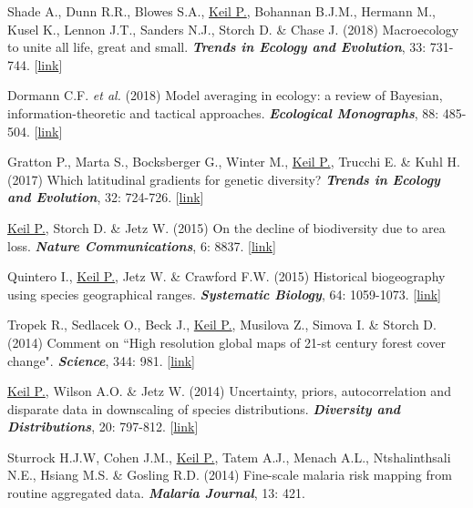 \begin{etaremune}
\item Shade A., Dunn R.R., Blowes S.A., \underline{Keil P.}, Bohannan B.J.M., Hermann M., Kusel K., Lennon J.T., Sanders N.J., Storch D. \& Chase J. (2018) Macroecology to unite all life, great and small. \textit{\textbf{Trends in Ecology and Evolution}}, 33: 731-744. [\href{https://www.sciencedirect.com/science/article/pii/S0169534718301861?via%3Dihub}{link}]

\item Dormann C.F. \textit{et al.} (2018) Model averaging in ecology: a review of Bayesian, information-theoretic and tactical approaches. \textit{\textbf{Ecological Monographs}}, 88: 485-504. [\href{https://esajournals.onlinelibrary.wiley.com/doi/10.1002/ecm.1309}{link}]

\item Gratton P., Marta S., Bocksberger G., Winter M., \underline{Keil P.}, Trucchi E. \& Kuhl H. (2017) Which latitudinal gradients for genetic diversity? \textit{\textbf{Trends in Ecology and Evolution}}, 32: 724-726. [\href{https://www.sciencedirect.com/science/article/pii/S0169534717301830?via%3Dihub}{link}]

\item \underline{Keil P.}, Storch D. \& Jetz W. (2015) On the decline of biodiversity due to area loss. \textit{\textbf{Nature Communications}}, 6: 8837. [\href{https://www.nature.com/articles/ncomms9837}{link}]

\item Quintero I., \underline{Keil P.}, Jetz W. \& Crawford F.W. (2015) Historical biogeography using species geographical ranges. \textit{\textbf{Systematic Biology}}, 64: 1059-1073. [\href{http://sysbio.oxfordjournals.org/content/64/6/1059.short}{link}] 

\item Tropek R., Sedlacek O., Beck J., \underline{Keil P.}, Musilova Z., Simova I. \& Storch D. (2014) Comment on ``High resolution global maps of 21-st century forest cover change". \textit{\textbf{Science}}, 344: 981. [\href{http://www.sciencemag.org/content/344/6187/981.4.full}{link}] 

\item \underline{Keil P.}, Wilson A.O. \& Jetz W. (2014) Uncertainty, priors, autocorrelation and disparate data in downscaling of species distributions. \textit{\textbf{Diversity and Distributions}}, 20: 797-812. [\href{http://onlinelibrary.wiley.com/doi/10.1111/ddi.12199/abstract}{link}]

\item Sturrock H.J.W, Cohen J.M., \underline{Keil P.}, Tatem A.J., Menach A.L., Ntshalinthsali N.E., Hsiang M.S. \& Gosling R.D. (2014) Fine-scale malaria risk mapping from routine aggregated data. \textit{\textbf{Malaria Journal}}, 13: 421.


\end{etaremune}
